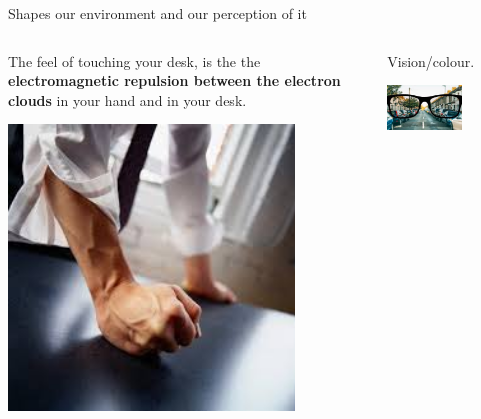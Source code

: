 \begin{frame}{Shapes our environment and our perception of it}

\begin{columns}
  \begin{column}{0.50\textwidth}
    {\scriptsize
     The feel of touching your desk, is the
     the {\bf electromagnetic repulsion between the electron clouds}
     in your hand and in your desk.\\
    }
    \begin{center}
     \includegraphics[width=0.80\textwidth]{./images/misc/hit_hand_on_desk.jpg}\\
    \end{center}
    \vspace{1.2cm}
  \end{column}
  \begin{column}{0.50\textwidth}
    {\scriptsize
      Vision/colour.\\
    }
    \begin{center}
     \includegraphics[width=0.60\textwidth]{./images/misc/vision_0.jpg}\\

\end{center}
\end{column}
\end{columns}
\end{frame}
